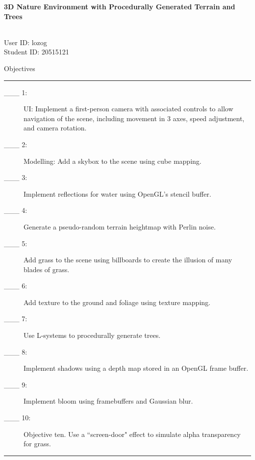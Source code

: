 \documentclass{article}
\newcommand\projecttitle{3D Nature Environment with Procedurally Generated Terrain and Trees}
\newcommand\myname{Liam Ozog}
\newcommand\myuserid{lozog}
\newcommand\mystudentid{20515121}
\begin{document}
\newpage

{\noindent \huge \bf 
	\projecttitle 
}

\medskip
\noindent{Name: \myname} \\ 
User ID: \myuserid \\ 
Student ID: \mystudentid 

\bigskip
{\Large Objectives}

\hrule
\begin{description}
        \item[\_\_\_ 1:]
          UI: Implement a first-person camera with associated controls to allow navigation of the scene, including movement in 3 axes, speed adjustment, and camera rotation.

        \item[\_\_\_ 2:]
		  Modelling: Add a skybox to the scene using cube mapping.

        \item[\_\_\_ 3:]
		  Implement reflections for water using OpenGL's stencil buffer.
			
        \item[\_\_\_ 4:]
		  Generate a pseudo-random terrain heightmap with Perlin noise.

        \item[\_\_\_ 5:]
		  Add grass to the scene using billboards to create the illusion of many blades of grass.

        \item[\_\_\_ 6:]
	      Add texture to the ground and foliage using texture mapping.

        \item[\_\_\_ 7:]
		  Use L-systems to procedurally generate trees.

        \item[\_\_\_ 8:]
		  Implement shadows using a depth map stored in an OpenGL frame buffer.

        \item[\_\_\_ 9:]
		  Implement bloom using framebuffers and Gaussian blur.

        \item[\_\_\_ 10:]
		  Objective ten. Use a ``screen-door" effect to simulate alpha transparency for grass.

\end{description}

\hrule
\end{document}
